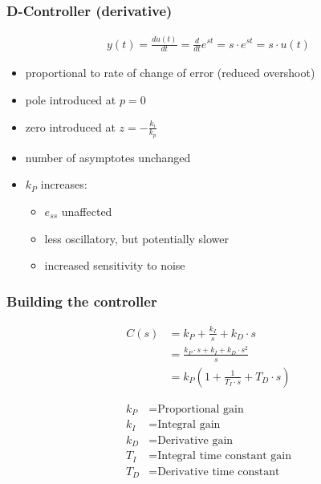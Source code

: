     \subsubsection{D-Controller (derivative)}
            \begin{align*}
                y(t) = \frac{d u(t)}{dt} = \frac{d}{dt} e^{st} = s \cdot e^{st} = s \cdot u(t)
            \end{align*}
        \begin{itemize}
            \item proportional to rate of change of error (reduced overshoot)
            \item pole introduced at $p=0$
            \item zero introduced at $z = -\frac{k_i}{k_p}$
            \item number of asymptotes unchanged
            \item $k_P$ increases:
            \begin{itemize}
                \item $e_{ss}$ unaffected
                \item less oscillatory, but potentially slower
                \item increased sensitivity to noise
            \end{itemize}
        \end{itemize}

    \subsubsection{Building the controller}
        \begin{minipage}{0.49\linewidth}
            \begin{align*}
                C(s) &= k_P + \frac{k_I}{s} + k_D \cdot s\\
                &= \frac{k_P \cdot s + k_I + k_D \cdot s^2}{s}\\
                &= k_P(1 + \frac{1}{T_I \cdot s} + T_D \cdot s)
            \end{align*}
        \end{minipage}
        \begin{minipage}{0.49\linewidth}
            \begin{scriptsize}
                \begin{align*}
                    k_P &= \text{Proportional gain}\\
                    k_I &= \text{Integral gain}\\
                    k_D &= \text{Derivative gain}\\
                    T_I &= \text{Integral time constant gain}\\
                    T_D &= \text{Derivative time constant}
                \end{align*}
            \end{scriptsize}
        \end{minipage}
